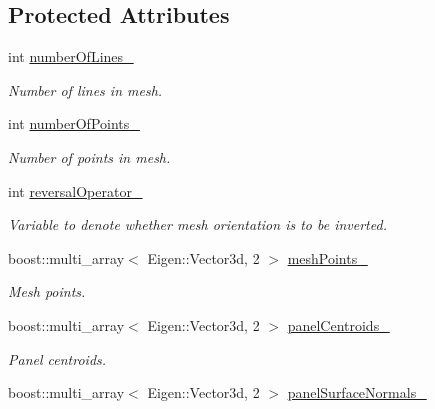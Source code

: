 \subsection*{Protected Attributes}
\begin{DoxyCompactItemize}
\item 
int \hyperlink{classtudat_1_1geometric__shapes_1_1QuadrilateralMeshedSurfaceGeometry_a1eeb4e61e296455cf92a869f043f5341}{number\+Of\+Lines\+\_\+}
\begin{DoxyCompactList}\small\item\em Number of lines in mesh. \end{DoxyCompactList}\item 
int \hyperlink{classtudat_1_1geometric__shapes_1_1QuadrilateralMeshedSurfaceGeometry_a8d2057019d4b46515e48dfa196ac4af0}{number\+Of\+Points\+\_\+}
\begin{DoxyCompactList}\small\item\em Number of points in mesh. \end{DoxyCompactList}\item 
int \hyperlink{classtudat_1_1geometric__shapes_1_1QuadrilateralMeshedSurfaceGeometry_ac5de108458e15b4f1884c6e3ad2a1043}{reversal\+Operator\+\_\+}
\begin{DoxyCompactList}\small\item\em Variable to denote whether mesh orientation is to be inverted. \end{DoxyCompactList}\item 
boost\+::multi\+\_\+array$<$ Eigen\+::\+Vector3d, 2 $>$ \hyperlink{classtudat_1_1geometric__shapes_1_1QuadrilateralMeshedSurfaceGeometry_aaa6f41fadbe6a187c441ab23feba8e68}{mesh\+Points\+\_\+}
\begin{DoxyCompactList}\small\item\em Mesh points. \end{DoxyCompactList}\item 
boost\+::multi\+\_\+array$<$ Eigen\+::\+Vector3d, 2 $>$ \hyperlink{classtudat_1_1geometric__shapes_1_1QuadrilateralMeshedSurfaceGeometry_a715ff3e3943b8c60fe5bcd0f64163a67}{panel\+Centroids\+\_\+}
\begin{DoxyCompactList}\small\item\em Panel centroids. \end{DoxyCompactList}\item 
boost\+::multi\+\_\+array$<$ Eigen\+::\+Vector3d, 2 $>$ \hyperlink{classtudat_1_1geometric__shapes_1_1QuadrilateralMeshedSurfaceGeometry_ad4ce6acf3444f33b85e4835d9288bf26}{panel\+Surface\+Normals\+\_\+}

\end{DoxyCompactItemize}
